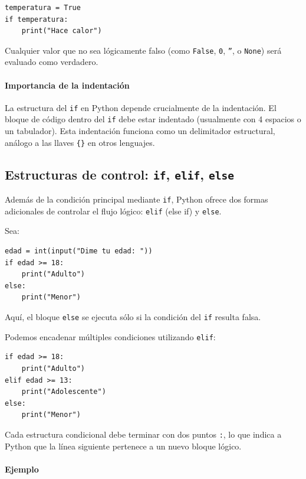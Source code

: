 \documentclass{article}
\theoremstyle{nonumberplain}
\begin{document}
\begin{verbatim}
temperatura = True
if temperatura:
    print("Hace calor")
\end{verbatim}

Cualquier valor que no sea lógicamente falso (como \texttt{False}, \texttt{0}, \texttt{''}, o \texttt{None}) será evaluado como verdadero.

\paragraph{Importancia de la indentación}

La estructura del \texttt{if} en Python depende crucialmente de la indentación. El bloque de código dentro del \texttt{if} debe estar indentado (usualmente con 4 espacios o un tabulador). Esta indentación funciona como un delimitador estructural, análogo a las llaves \texttt{\{\}} en otros lenguajes.



\subsection*{Estructuras de control: \texttt{if}, \texttt{elif}, \texttt{else}}

Además de la condición principal mediante \texttt{if}, Python ofrece dos formas adicionales de controlar el flujo lógico: \texttt{elif} (else if) y \texttt{else}.

Sea:

\begin{verbatim}
edad = int(input("Dime tu edad: "))
if edad >= 18:
    print("Adulto")
else:
    print("Menor")
\end{verbatim}

Aquí, el bloque \texttt{else} se ejecuta sólo si la condición del \texttt{if} resulta falsa.

Podemos encadenar múltiples condiciones utilizando \texttt{elif}:

\begin{verbatim}
if edad >= 18:
    print("Adulto")
elif edad >= 13:
    print("Adolescente")
else:
    print("Menor")
\end{verbatim}

Cada estructura condicional debe terminar con dos puntos \texttt{:}, lo que indica a Python que la línea siguiente pertenece a un nuevo bloque lógico.

\paragraph{Ejemplo}
\end{document}
